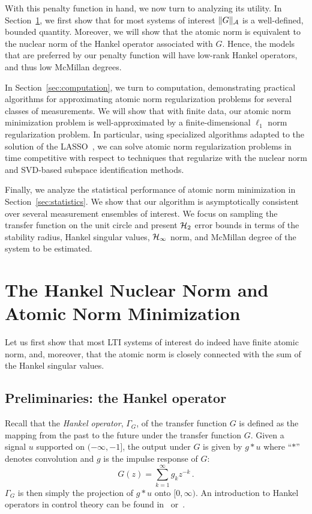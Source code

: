 With this penalty function in hand, we now turn to analyzing its utility.  In Section~\ref{sec:hankel}, we first show that for most systems of interest $\|G\|_{\mathcal{A}}$ is a well-defined, bounded quantity.  Moreover, we will show that the atomic norm is equivalent to the nuclear norm of the Hankel operator associated with  $G$.  Hence, the models that are preferred by our penalty function will have low-rank Hankel operators, and thus low McMillan degrees.

In Section~\ref{sec:computation}, we turn to computation, demonstrating practical algorithms for approximating atomic norm regularization problems for several classes of measurements.  We will show that with finite data, our atomic norm minimization problem is well-approximated by a finite-dimensional $\ell_1$ norm regularization problem.  In particular, using specialized algorithms adapted to the solution of the LASSO~\cite{Wright09}, we can solve atomic norm regularization problems in time competitive with respect to techniques that regularize with the nuclear norm and SVD-based subspace identification methods.

Finally, we analyze the statistical performance of atomic norm minimization in Section~\ref{sec:statistics}.  We show that our algorithm is asymptotically consistent over several measurement ensembles of interest.  We focus on sampling the transfer function on the unit circle and present $\mathcal{H}_2$ error bounds in terms of the stability radius, Hankel singular values, $\mathcal{H}_{\infty}$ norm, and McMillan degree of the system to be estimated.

\section{The Hankel Nuclear Norm and Atomic Norm Minimization}\label{sec:hankel}

Let us first show that most LTI systems of interest do indeed have finite atomic norm, and, moreover, that the atomic norm is closely connected with the sum of the Hankel singular values.

\subsection{Preliminaries: the Hankel operator}\label{sec:hankel-defs}
Recall that the \emph{Hankel operator}, $\Gamma_G$, of the transfer function $G$ is defined as the mapping from the past to the future under the transfer function $G$.  Given a signal $u$ supported on $(-\infty,-1]$, the output under $G$ is given by $g * u$ where ``$*$'' denotes convolution and $g$ is the impulse response of $G$: 
\[
	G(z) = \sum_{k=1}^\infty g_k z^{-k}\,.
\]
$\Gamma_G$ is then simply the projection of $g*u$ onto $[0,\infty)$.  An introduction to Hankel operators in control theory can be found in~\cite[Chapter 4]{DullerudPaganiniBook} or~\cite[Chapter 7]{Zhou95}.

